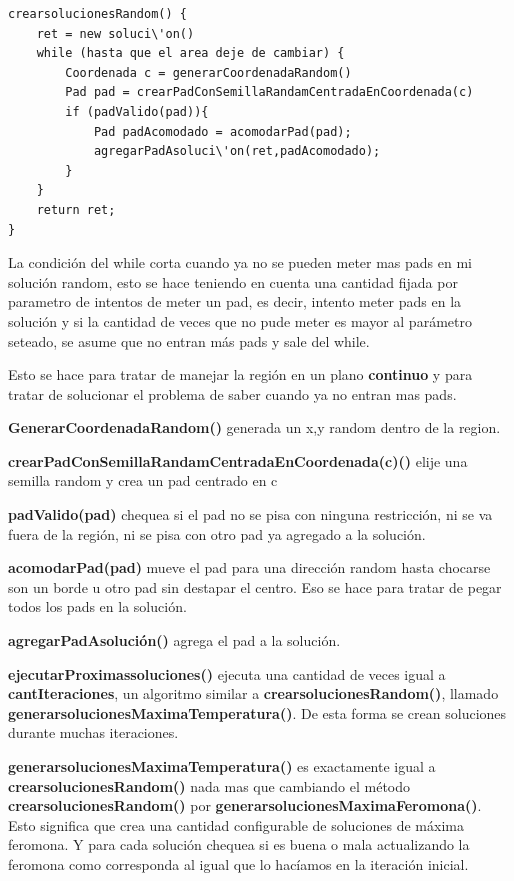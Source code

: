 \newpage

\begin{verbatim}	
crearsolucionesRandom() {
    ret = new soluci\'on()
    while (hasta que el area deje de cambiar) {
        Coordenada c = generarCoordenadaRandom()
        Pad pad = crearPadConSemillaRandamCentradaEnCoordenada(c)
        if (padValido(pad)){
            Pad padAcomodado = acomodarPad(pad);
            agregarPadAsoluci\'on(ret,padAcomodado);
        }
    }
    return ret;
}
\end{verbatim}	

La condici\'on del while corta cuando ya no se pueden meter mas pads en mi soluci\'on random, esto se hace teniendo en cuenta una cantidad fijada por parametro de intentos de meter un pad, es decir, intento meter pads en la soluci\'on y si la cantidad de veces que no pude meter es mayor al par\'ametro seteado, se asume que no entran m\'as pads y sale del while. 

Esto se hace para tratar de manejar la regi\'on en un plano \textbf{continuo} y para tratar de solucionar el problema de saber cuando ya no entran mas pads.

\textbf{GenerarCoordenadaRandom()} generada un x,y random dentro de la region. 

\textbf{crearPadConSemillaRandamCentradaEnCoordenada(c)()} elije una semilla random y crea un pad centrado en c

\textbf{padValido(pad)} chequea si el pad no se pisa con ninguna restricci\'on, ni se va fuera de la regi\'on, ni se pisa con otro pad ya agregado a la soluci\'on.

\textbf{acomodarPad(pad)} mueve el pad para una direcci\'on random hasta chocarse son un borde u otro pad sin destapar el centro. Eso se hace para tratar de pegar todos los pads en la soluci\'on.

\textbf{agregarPadAsoluci\'on()} agrega el pad a la soluci\'on.

\textbf{ejecutarProximassoluciones()} ejecuta una cantidad de veces igual a \textbf{cantIteraciones}, un algoritmo similar a \textbf{crearsolucionesRandom()}, llamado \textbf{generarsolucionesMaximaTemperatura()}. De esta forma se crean soluciones durante muchas iteraciones.

\textbf{generarsolucionesMaximaTemperatura()} es exactamente igual a \textbf{crearsolucionesRandom()} nada mas que cambiando el m\'etodo \textbf{crearsolucionesRandom()} por \textbf{generarsolucionesMaximaFeromona()}. Esto significa que crea una cantidad configurable de soluciones de m\'axima feromona. Y para cada soluci\'on chequea si es buena o mala actualizando la feromona como corresponda al igual que lo hac\'iamos en la iteraci\'on inicial.

